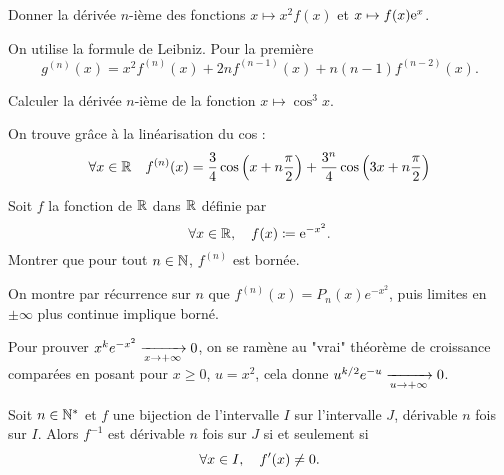 \documentclass{magnolia}
\begin{document}
\begin{exos}
\exo %
  Donner la dérivée $n$-ième des fonctions $x\mapsto x^2f(x)$ et
  $x\mapsto f(x){\rm e}^x$.
\begin{sol}
On utilise la formule de Leibniz. 
Pour la première $$g^{(n)}(x)=x^2f^{(n)}(x)+2nf^{(n-1)}(x)+n(n-1)f^{(n-2)}(x).$$
\end{sol}
\exo Calculer la dérivée $n$-ième de la fonction $x\mapsto \cos^3 x$.
  \begin{sol}
  On trouve grâce à la linéarisation du cos :
  \[\forall x\in\mathbb{R} \quad
    f^{(n)}(x)=\frac{3}{4}\cos\left(x+n\frac{\pi}{2}\right)+
                  \frac{3^n}{4}\cos\left(3x+n\frac{\pi}{2}\right)\]  
  \end{sol}
\exo Soit $f$ la fonction de $\mathbb{R}$ dans $\mathbb{R}$ définie par
  \[\forall x\in\mathbb{R} ,\quad f(x)\coloneqq{\rm e}^{-x^2}.\]
  Montrer que pour tout $n\in\mathbb{N}$, $f^{(n)}$ est bornée.
  \begin{sol}
    On montre par récurrence sur $n$ que $f^{(n)}(x)=P_n(x)e^{-x^2}$, puis limites en $\pm \infty$ plus continue implique borné.
    
  Pour prouver $x^ke^{-x^2}\xrightarrow[x\rightarrow +\infty]{}0$, on se ramène au "vrai" théorème de croissance comparées en posant pour $x\geq 0$, $u=x^2$, cela donne $u^{k/2}e^{-u}\xrightarrow[u\rightarrow +\infty]{}0$. 
    \end{sol}
\end{exos}

\begin{proposition}[utile=-3]
Soit $n\in{\mathbb{N}^*}$ et $f$ une bijection de l'intervalle $I$ sur l'intervalle
$J$, dérivable $n$ fois sur $I$. Alors $f^{-1}$ est dérivable $n$ fois sur $J$ si et seulement
si
\[\forall x\in I ,\quad f'(x)\neq 0.\]
\end{proposition}
\end{document}
